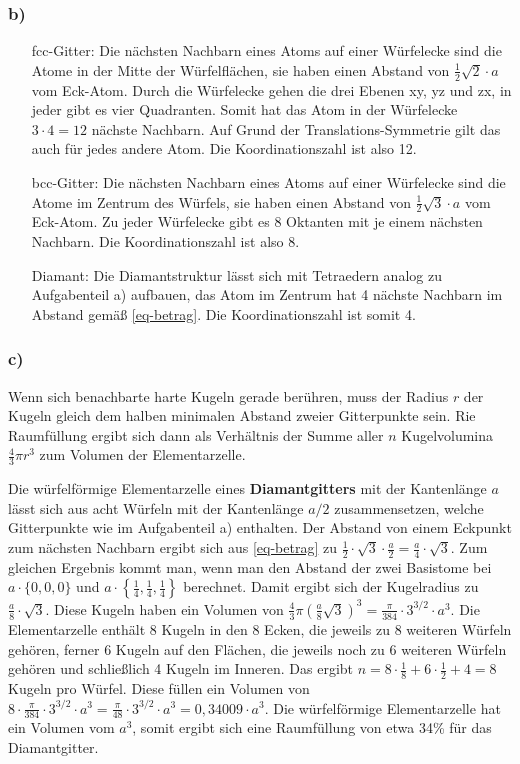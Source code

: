 \documentclass[11pt]{article}
\begin{document}
\subsubsection*{b)}
\begin{itemize}
  \item [fcc-Gitter:] Die nächsten Nachbarn eines Atoms auf einer Würfelecke sind
  die Atome in der Mitte der Würfelflächen, sie haben einen Abstand von
  $\frac{1}{2} \sqrt{2} \cdot a$  vom Eck-Atom. Durch die Würfelecke gehen
  die drei Ebenen xy, yz und zx, in jeder
  gibt es vier Quadranten. Somit hat das Atom in der Würfelecke $3 \cdot 4 = 12$
  nächste Nachbarn. Auf Grund der Translations-Symmetrie gilt das auch für jedes
  andere Atom. Die Koordinationszahl ist also 12.
    \item [bcc-Gitter:] Die nächsten Nachbarn eines Atoms auf einer Würfelecke sind
  die Atome im Zentrum des Würfels, sie haben einen Abstand von $\frac{1}{2} \sqrt{3} \cdot a$
  vom Eck-Atom. Zu jeder Würfelecke gibt es 8 Oktanten mit je einem nächsten Nachbarn.
  Die Koordinationszahl ist also 8.
  \item[Diamant:] Die Diamantstruktur lässt sich mit Tetraedern analog zu
  Aufgabenteil a) aufbauen, das Atom im Zentrum hat 4 nächste Nachbarn im Abstand
  gemäß \eqref{eq-betrag}. Die Koordinationszahl ist somit 4.
\end{itemize}

\subsubsection*{c)} Wenn sich benachbarte harte Kugeln gerade berühren, muss der
Radius $r$ der Kugeln gleich dem halben minimalen Abstand zweier Gitterpunkte sein.
Rie Raumfüllung ergibt sich dann als Verhältnis der Summe aller $n$ Kugelvolumina
$\frac{4}{3} \pi r^3$ zum Volumen der Elementarzelle.

Die würfelförmige Elementarzelle eines \textbf{Diamantgitters} mit der Kantenlänge $a$
lässt sich aus acht Würfeln mit der Kantenlänge $a/2$ zusammensetzen, welche
Gitterpunkte wie im Aufgabenteil a) enthalten. Der Abstand von einem Eckpunkt zum
nächsten Nachbarn ergibt sich aus \eqref{eq-betrag} zu
$\frac{1}{2} \cdot \sqrt{3} \cdot \frac{a}{2} = \frac{a}{4} \cdot \sqrt{3}$. Zum
gleichen Ergebnis kommt man, wenn man den Abstand der zwei Basistome bei $a \cdot \{0,0,0\}$
und $a \cdot \left\{\frac{1}{4}, \frac{1}{4}, \frac{1}{4}\right\}$ berechnet.
Damit ergibt sich der Kugelradius zu $\frac{a}{8} \cdot \sqrt{3}$.
Diese Kugeln haben ein Volumen von $\frac{4}{3} \pi \left(\frac{a}{8} \sqrt{3}\right)^3 =
\frac{\pi}{384} \cdot 3^{3/2} \cdot a^3$. Die Elementarzelle enthält 8 Kugeln in den
8 Ecken, die jeweils zu 8 weiteren Würfeln gehören, ferner 6 Kugeln auf den Flächen,
die jeweils noch zu 6 weiteren Würfeln gehören und schließlich 4 Kugeln im Inneren.
Das ergibt $n = 8 \cdot \frac{1}{8} + 6 \cdot \frac{1}{2} + 4 = 8$ Kugeln pro Würfel.
Diese füllen ein Volumen von $8 \cdot \frac{\pi}{384} \cdot 3^{3/2} \cdot a^3 =
\frac{\pi}{48} \cdot 3^{3/2} \cdot a^3 = 0,34009 \cdot a^3$. Die würfelförmige
Elementarzelle hat ein Volumen vom $a^3$, somit ergibt sich eine Raumfüllung von
etwa 34\% für das Diamantgitter.
\end{document}
